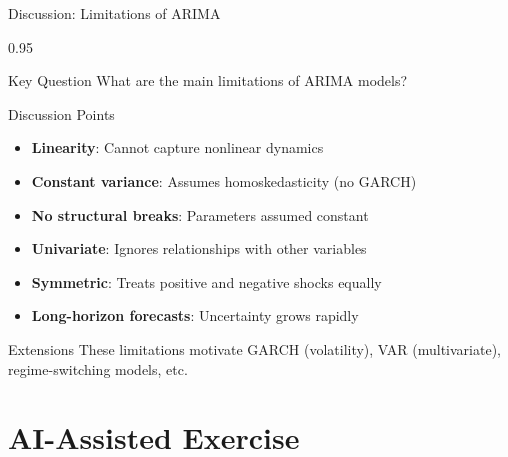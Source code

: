 \documentclass[9pt, aspectratio=169, t]{beamer}
\begin{document}
\begin{frame}{Discussion: Limitations of ARIMA}
    \begin{cminipage}{0.95\textwidth}
    \begin{block}{Key Question}
        What are the main limitations of ARIMA models?
    \end{block}

    \vspace{0.3cm}

    \begin{block}{Discussion Points}
        {\small
        \begin{itemize}\setlength{\itemsep}{0pt}
            \item \textbf{Linearity}: Cannot capture nonlinear dynamics
            \item \textbf{Constant variance}: Assumes homoskedasticity (no GARCH)
            \item \textbf{No structural breaks}: Parameters assumed constant
            \item \textbf{Univariate}: Ignores relationships with other variables
            \item \textbf{Symmetric}: Treats positive and negative shocks equally
            \item \textbf{Long-horizon forecasts}: Uncertainty grows rapidly
        \end{itemize}
        }
    \end{block}
    \vspace{0.1cm}
    \begin{alertblock}{Extensions}
        {\small These limitations motivate GARCH (volatility), VAR (multivariate), regime-switching models, etc.}
    \end{alertblock}
    \end{cminipage}
\end{frame}

\section{AI-Assisted Exercise}
\end{document}
